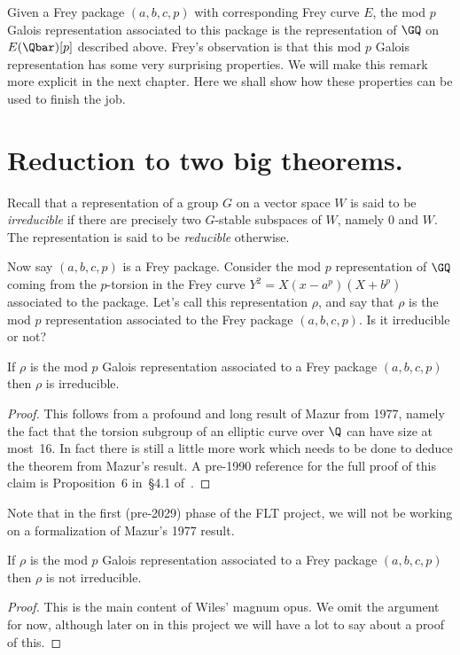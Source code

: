 Given a Frey package $(a,b,c,p)$ with corresponding Frey curve $E$, the mod $p$ Galois
representation associated to this package is the representation of $\GQ$ on $E(\Qbar)[p]$
described above. Frey's observation is that this mod $p$ Galois representation has some very
surprising properties. We will make this remark more explicit in the next chapter.
Here we shall show how these properties can be used to finish the job.

\section{Reduction to two big theorems.}

Recall that a representation of a group $G$ on a vector space $W$ is said to be \emph{irreducible}
if there are precisely two $G$-stable subspaces of $W$, namely $0$ and $W$.
The representation is said to be \emph{reducible} otherwise.

Now say $(a,b,c,p)$ is a Frey package.
Consider the mod $p$ representation of $\GQ$ coming from the $p$-torsion in the Frey
curve $Y^2=X(x-a^p)(X+b^p)$ associated to the package. Let's call this representation $\rho$,
and say that $\rho$ is the mod $p$ representation associated to the Frey package $(a,b,c,p)$.
Is it irreducible or not?

\begin{theorem}[Mazur]
  \label{FLT.Mazur_Frey}
  \leanok
  If $\rho$ is the mod $p$ Galois representation associated to a Frey package $(a,b,c,p)$ then
  $\rho$ is irreducible.
\end{theorem}
\begin{proof}
  \notready
  This follows from a profound and long result of Mazur \cite{mazur-torsion} from 1977,
  namely the fact that the torsion subgroup of an elliptic curve over $\Q$ can have size at most~16.
  In fact there is still a little more work which needs to be done to deduce the theorem from
  Mazur's result. A pre-1990 reference for the full proof of this claim is Proposition~6
  in~\S4.1 of~\cite{serreconj}.
\end{proof}

Note that in the first (pre-2029) phase of the FLT project, we will not be working on
a formalization of Mazur's 1977 result.

\begin{theorem}
  \label{FLT.Wiles_Frey}
  \leanok
  If $\rho$ is the mod $p$ Galois representation associated to a Frey package $(a,b,c,p)$ then
  $\rho$ is not irreducible.
\end{theorem}
\begin{proof}
  This is the main content of Wiles' magnum opus.
  We omit the argument for now, although later on in this project
  we will have a lot to say about a proof of this.
\end{proof}

